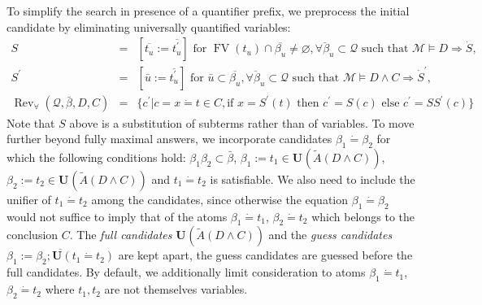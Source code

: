 \documentclass{article}
\newcommand{\assign}{:=}
\newcommand{\tmem}[1]{{\em #1\/}}
\newcommand{\tmmathbf}[1]{\ensuremath{\boldsymbol{#1}}}
\newcommand{\tmop}[1]{\ensuremath{\operatorname{#1}}}
\begin{document}
To simplify the search in presence of a quantifier prefix, we preprocess the
initial candidate by eliminating universally quantified variables:
\begin{eqnarray*}
  S & = & [\overline{t_u} \assign \overline{t^{\prime}_u}] \text{ for }
  \tmop{FV} (t_u) \cap \overline{\beta_u} \neq \varnothing, \overline{\forall
  \beta_u} \subset \mathcal{Q} \text{ such that } \mathcal{M} \vDash D
  \Rightarrow \dot{S},\\
  S^{\prime} & = & [\bar{u} \assign \overline{t^{\prime}_u}] \text{ for }
  \bar{u} \subset \overline{\beta_u}, \overline{\forall \beta_u} \subset
  \mathcal{Q} \text{ such that } \mathcal{M} \vDash D \wedge C \Rightarrow
  \dot{S}^{\prime},\\
  \tmop{Rev}_{\forall} (\mathcal{Q}, \bar{\beta}, D, C) & = & \{ c^{\prime} |
  c = x \dot{=} t \in C, \text{if } x = S^{\prime} (t) \text{ then }
  c^{\prime} = S (c) \text{ else } c^{\prime} = SS^{\prime} (c) \}
\end{eqnarray*}
Note that $S$ above is a substitution of subterms rather than of variables. To
move further beyond fully maximal answers, we incorporate candidates $\beta_1
\dot{=} \beta_2$ for which the following conditions hold: $\beta_1 \beta_2
\subset \bar{\beta}$, $\beta_1 \assign t_1 \in \tmmathbf{U}_{} (\tilde{A} (D
\wedge C))$, $\beta_2 \assign t_2 \in \tmmathbf{U}_{} (\tilde{A} (D \wedge
C))$ and $t_1 \dot{=} t_2$ is satisfiable. We also need to include the unifier
of $t_1 \dot{=} t_2$ among the candidates, since otherwise the equation
$\beta_1 \dot{=} \beta_2$ would not suffice to imply that of the atoms
$\beta_1 \dot{=} t_1$, $\beta_2 \dot{=} t_2$ which belongs to the conclusion
$C$. The {\tmem{full candidates}} $\tmmathbf{U}_{} (\tilde{A} (D \wedge C))$
and the {\tmem{guess candidates}} $\overline{\beta_1 \assign \beta_2 ;
\tmmathbf{U} (t_1 \dot{=} t_2)}$ are kept apart, the guess candidates are
guessed before the full candidates. By default, we additionally limit
consideration to atoms $\beta_1 \dot{=} t_1$, $\beta_2 \dot{=} t_2$ where
$t_1, t_2$ are not themselves variables.
\end{document}
